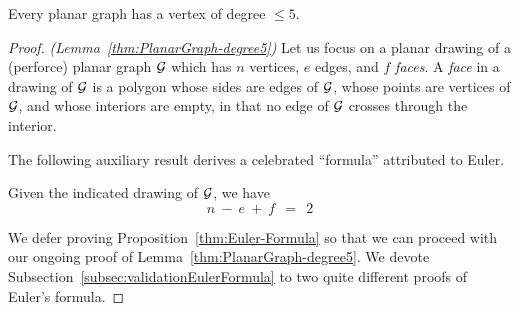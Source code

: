 \begin{lemma}
\label{thm:PlanarGraph-degree5}
Every planar graph has a vertex of degree $\leq 5$.
\end{lemma}

\begin{proof} {\em (Lemma~\ref{thm:PlanarGraph-degree5})}
Let us focus on a planar drawing of a (perforce) planar graph $\mbox{$\cal G$}$
which has $n$ vertices, $e$ edges, and $f$ {\it faces}.  A {\it face}
in a drawing of $\mbox{$\cal G$}$ is a polygon whose sides are edges of
$\mbox{$\cal G$}$, whose points are vertices of $\mbox{$\cal G$}$, and whose interiors are empty,
in that no edge of $\mbox{$\cal G$}$ crosses through the interior.

\bigskip

\noindent {}
\bigskip

The following auxiliary result derives a celebrated ``formula'' attributed to Euler.   

\begin{prop} 
\label{thm:Euler-Formula}
Given the indicated drawing of $\mbox{$\cal G$}$, we have
\begin{equation}
\label{eqn:Eulers-formula}
n \ - \ e \ + \ f \ \ = \ \ 2
\end{equation}
\end{prop}

\medskip

We defer proving Proposition~\ref{thm:Euler-Formula} so that we can proceed with our
ongoing proof of Lemma~\ref{thm:PlanarGraph-degree5}.  
We devote Subsection~\ref{subsec:validationEulerFormula} to 
two quite different proofs of Euler's formula.

\medskip


\end{proof}
